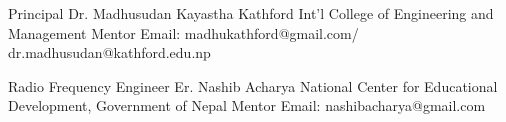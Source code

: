 
\begin{cventries}
  
   \cventry
    {Principal} %
    {Dr. Madhusudan Kayastha} %
    {Kathford Int’l College of Engineering and Management} %
    {Mentor} %
    {Email: madhukathford@gmail.com/ dr.madhusudan@kathford.edu.np} %
    
  \cventry
    {Radio Frequency Engineer} %
    {Er. Nashib Acharya} %
    {National Center for Educational Development, Government of Nepal} %
    {Mentor} %
    {Email: nashibacharya@gmail.com} %

\end{cventries}